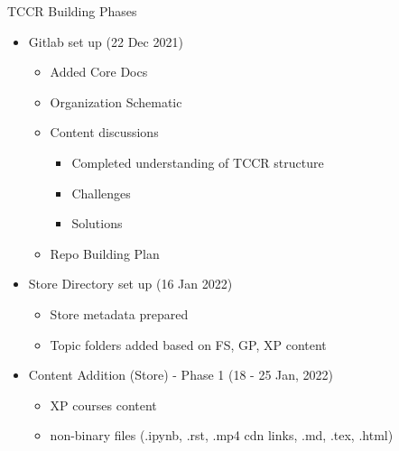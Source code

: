 \documentclass[aspectratio=169,14pt,usenames,dvipsnames]{beamer}
\begin{document}
\begin{frame}{TCCR Building Phases}
\begin{itemize}
	\item Gitlab set up (22 Dec 2021)
		\begin{itemize}
		\item Added Core Docs
		\item Organization Schematic
		\item Content discussions
			\begin{itemize}
			\item Completed understanding of TCCR structure
			\item Challenges
			\item Solutions
			\end{itemize}
		\item Repo Building Plan
		\end{itemize}
	\item Store Directory set up (16 Jan 2022)
		\begin{itemize}
		\item Store metadata prepared
		\item Topic folders added based on FS, GP, XP content
		\end{itemize}
	\item Content Addition (Store) - Phase 1 (18 - 25 Jan, 2022)
		\begin{itemize}
		\item XP courses content
		\item non-binary files (.ipynb, .rst, .mp4 cdn links, .md, .tex, .html)
		\end{itemize}
\end{itemize}
\end{frame}
\end{document}
